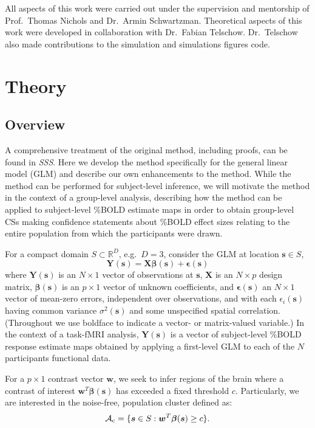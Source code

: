 All aspects of this work were carried out under the supervision and mentorship of Prof.\ Thomas Nichols and Dr.\ Armin Schwartzman. Theoretical aspects of this work were developed in collaboration with Dr.\ Fabian Telschow. Dr.\ Telschow also made contributions to the simulation and simulations figures code. 

\section{Theory}

\subsection{Overview}
\label{sec:Overview}
A comprehensive treatment of the original method, including proofs, can be found in \textit{SSS}.  Here we develop the method specifically for the general linear model (GLM) and describe our own enhancements to the method. While the method can be performed for subject-level inference, we will motivate the method in the context of a group-level analysis, describing how the method can be applied to subject-level \%BOLD estimate maps in order to obtain group-level CSs making confidence statements about \%BOLD effect sizes relating to the entire population from which the participants were drawn.

For a compact domain $S \subset \mathbb{R}^{D}$, e.g.~$D=3$, consider the GLM at location $\bm{s} \in S$,
\begin{equation}
\label{eq:CI_GLM}
\bm{Y}(\bm{s}) = \bm{X}\bm{\beta}(\bm{s}) + \bm{\epsilon}(\bm{s})	
\end{equation}
where $\bm{Y}(\bm{s})$ is an $N \times 1$ vector of observations at  $\bm{s}$, $\bm{X}$ is an $N \times p$ design matrix, $\bm{\beta}(\bm{s})$ is an $p \times 1$ vector of unknown coefficients, and $\bm{\epsilon}(\bm{s})$ an $N \times 1$ vector of mean-zero errors, independent over observations, and with each $\epsilon_i(\bm{s})$ having common variance $\sigma^2(\bm{s})$ and some unspecified spatial correlation. (Throughout we use boldface to indicate a vector- or matrix-valued variable.) In the context of a  task-fMRI analysis, $\bm{Y}(\bm{s})$ is a vector of subject-level \%BOLD response estimate maps obtained by applying a first-level GLM to each of the $N$ participants functional data. 

For a $p \times 1$ contrast vector $\bm{w}$, we seek to infer regions of the brain where a contrast of interest $\bm{w}^{T}\bm{\beta}(\bm{s})$ has exceeded a fixed threshold  $c$. Particularly, we are interested in the noise-free, population cluster defined as: 
\begin{equation}
\label{eq:CI_excursion}
\operatorname{\mathcal{A}_{c}} = \{\bm{s} \in S : \bm{w}^{T}\bm{\beta}(\bm{s}) \geq c \}.
\end{equation}

